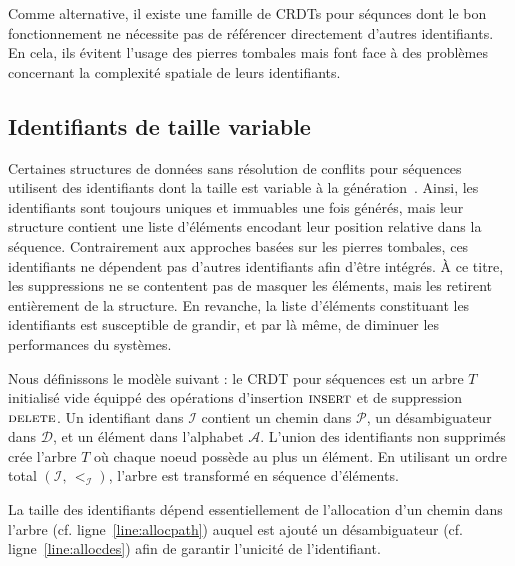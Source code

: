 Comme alternative, il existe une famille de CRDTs pour séqunces dont le bon
fonctionnement ne nécessite pas de référencer directement d'autres
identifiants. En cela, ils évitent l'usage des pierres tombales mais font face à
des problèmes concernant la complexité spatiale de leurs identifiants.

\subsection{Identifiants de taille variable}
\label{repl:subsec:variable}

Certaines structures de données sans résolution de conflits pour séquences
utilisent des identifiants dont la taille est variable à la
génération~\cite{andre2013supporting, preguica2009commutative,
  weiss2009logoot}. Ainsi, les identifiants sont toujours uniques et immuables
une fois générés, mais leur structure contient une liste d'éléments encodant
leur position relative dans la séquence.  Contrairement aux approches basées sur
les pierres tombales, ces identifiants ne dépendent pas d'autres identifiants
afin d'être intégrés. À ce titre, les suppressions ne se contentent pas de
masquer les éléments, mais les retirent entièrement de la structure. En
revanche, la liste d'éléments constituant les identifiants est susceptible de
grandir, et par là même, de diminuer les performances du systèmes.

Nous définissons le modèle suivant : le CRDT pour séquences est un arbre $T$
initialisé vide équippé des opérations d'insertion $\textsc{insert}$ et de
suppression $\textsc{delete}$. Un identifiant dans $\mathcal{I}$ contient un
chemin dans $\mathcal{P}$, un désambiguateur dans $\mathcal{D}$, et un élément
dans l'alphabet $\mathcal{A}$. L'union des identifiants non supprimés crée
l'arbre $T$ où chaque noeud possède au plus un élément.  En utilisant un ordre
total $(\mathcal{I},\, <_\mathcal{I})$, l'arbre est transformé en séquence
d'éléments.

La taille des identifiants dépend essentiellement de l'allocation d'un chemin
dans l'arbre (cf. ligne~\ref{line:allocpath}) auquel est ajouté un
désambiguateur (cf. ligne~\ref{line:allocdes}) afin de garantir l'unicité de
l'identifiant.


